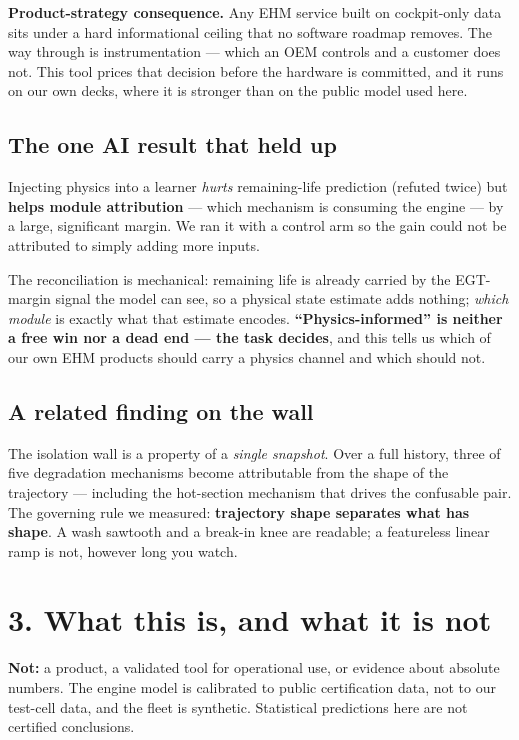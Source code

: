 \documentclass[11pt]{article}
\begin{document}
\textbf{Product-strategy consequence.} Any EHM service built on cockpit-only data
sits under a hard informational ceiling that no software roadmap removes. The way
through is instrumentation --- which an OEM controls and a customer does not.
This tool prices that decision before the hardware is committed, and it runs on
our own decks, where it is stronger than on the public model used here.

\subsection{The one AI result that held up}
Injecting physics into a learner \emph{hurts} remaining-life prediction (refuted
twice) but \textbf{helps module attribution} --- which mechanism is consuming the
engine --- by a large, significant margin. We ran it with a control arm so the
gain could not be attributed to simply adding more inputs.

The reconciliation is mechanical: remaining life is already carried by the
EGT-margin signal the model can see, so a physical state estimate adds nothing;
\emph{which module} is exactly what that estimate encodes. \textbf{``Physics-informed''
is neither a free win nor a dead end --- the task decides}, and this tells us
which of our own EHM products should carry a physics channel and which should not.

\subsection{A related finding on the wall}
The isolation wall is a property of a \emph{single snapshot}. Over a full
history, three of five degradation mechanisms become attributable from the shape
of the trajectory --- including the hot-section mechanism that drives the
confusable pair. The governing rule we measured: \textbf{trajectory shape
separates what has shape}. A wash sawtooth and a break-in knee are readable; a
featureless linear ramp is not, however long you watch.

\section{3. What this is, and what it is not}

\textbf{Not:} a product, a validated tool for operational use, or evidence about
absolute numbers. The engine model is calibrated to public certification data,
not to our test-cell data, and the fleet is synthetic. Statistical predictions
here are not certified conclusions.
\end{document}
